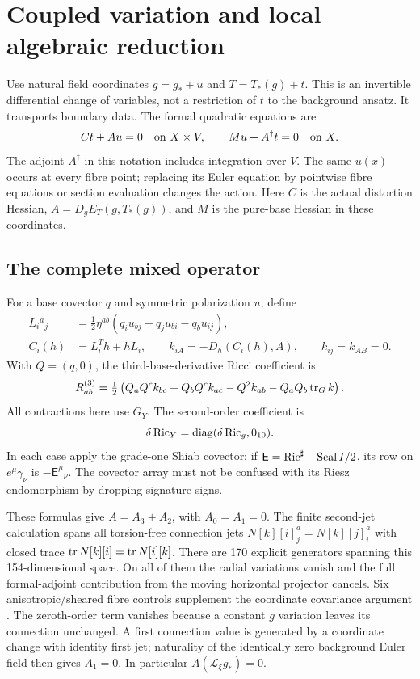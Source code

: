 \section{Coupled variation and local algebraic reduction}
\label{sec:reduction}

Use natural field coordinates $g=g_*+u$ and $T=T_*(g)+t$.
This is an invertible differential change of variables, not a restriction
of $t$ to the background ansatz. It transports boundary data.
The formal quadratic equations are
\begin{equation}
 Ct+Au=0\quad\hbox{on }X\times V,\qquad
 Mu+A^\dagger t=0\quad\hbox{on }X.\label{eq:coupled}
\end{equation}
The adjoint $A^\dagger$ in this notation includes integration over $V$.
The same $u(x)$ occurs at every fibre point; replacing its Euler equation
by pointwise fibre equations or section evaluation changes the action.
Here $C$ is the actual distortion Hessian, $A=D_gE_T(g,T_*(g))$, and
$M$ is the pure-base Hessian in these coordinates.

\subsection{The complete mixed operator}
For a base covector $q$ and symmetric polarization $u$, define
\begin{align}
 L_i{}^a{}_j&=\tfrac12\eta^{ab}(q_i u_{bj}+q_j u_{bi}-q_bu_{ij}),
 \nonumber\\
 C_i(h)&=L_i^Th+hL_i,\qquad
 k_{iA}=-D_h(C_i(h),A),\qquad k_{ij}=k_{AB}=0.\label{eq:lift}
\end{align}
With $Q=(q,0)$, the third-base-derivative Ricci coefficient is
\begin{equation}
 R^{(3)}_{ab}=\tfrac12\left(Q_aQ^ck_{bc}+Q_bQ^ck_{ac}
                -Q^2k_{ab}-Q_aQ_b\operatorname{tr}_Gk\right).\label{eq:A3}
\end{equation}
All contractions here use $G_Y$. The second-order coefficient is
\begin{equation}
 \delta\operatorname{Ric}_Y=\operatorname{diag}(\delta\operatorname{Ric}_g,0_{10}).\label{eq:A2}
\end{equation}
In each case apply the grade-one Shiab covector: if
$\mathsf E=\operatorname{Ric}^\sharp-\operatorname{Scal} I/2$, its row on $e^\mu\gamma_\nu$ is
$-\mathsf E^\mu{}_{\nu}$. The covector array must not be confused with
its Riesz endomorphism by dropping signature signs.

These formulas give $A=A_3+A_2$, with $A_0=A_1=0$.
The finite second-jet calculation spans all torsion-free connection jets
$N[k][i]^a_j=N[k][j]^a_i$ with closed trace
$\operatorname{tr} N[k][i]=\operatorname{tr} N[i][k]$. There are 170 explicit generators spanning
this 154-dimensional space. On all of them the radial variations vanish
and the full formal-adjoint contribution from the moving horizontal
projector cancels. Six anisotropic/sheared fibre controls supplement the
coordinate covariance argument \cite{Mixed,Algebraic}.
The zeroth-order term vanishes because a constant $g$ variation leaves
its connection unchanged. A first connection value is generated by a
coordinate change with identity first jet; naturality of the identically
zero background Euler field then gives $A_1=0$.
In particular $A(\mathcal L_\xi g_*)=0$.

